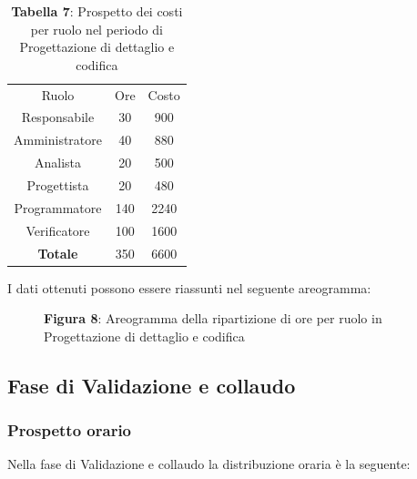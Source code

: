 \begin{table}[H]
	\centering
	\renewcommand{\arraystretch}{1.5}
	\begin{tabular}{|c|c|c|}
		\hline
		\rowcolor{lighter-grayer}
		Ruolo & Ore & Costo \\
Responsabile   & 30  & 900  \\ \hline
Amministratore & 40  & 880  \\ \hline
Analista       & 20  & 500  \\ \hline
Progettista    & 20  & 480  \\ \hline
Programmatore  & 140 & 2240 \\ \hline
Verificatore   & 100 & 1600 \\ \hline
\textbf{Totale}& 350 & 6600 \\ \hline
	\end{tabular}
	\caption*{\textbf{Tabella 7}: Prospetto dei costi per ruolo nel periodo di Progettazione di dettaglio e codifica\\}
\end{table}

I dati ottenuti possono essere riassunti nel seguente areogramma:


\begin{figure}[H]
	\centering
	\caption*{\textbf{Figura 8}: Areogramma della ripartizione di ore per ruolo in Progettazione di dettaglio e codifica}
	\label{fig:Figura10}
\end{figure}

\subsection{Fase di Validazione e collaudo}
\subsubsection{Prospetto orario}
Nella fase di Validazione e collaudo la distribuzione oraria è la seguente:

